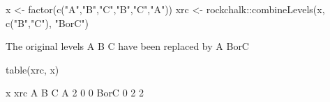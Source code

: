 \begin{Schunk}
\begin{Sinput}
  x <- factor(c("A","B","C","B","C","A"))
  xrc <- rockchalk::combineLevels(x, c("B","C"), "BorC")
\end{Sinput}
\begin{Soutput}
The original levels A B C 
have been replaced by A BorC 
\end{Soutput}
\begin{Sinput}
  table(xrc, x)
\end{Sinput}
\begin{Soutput}
      x
xrc    A B C
  A    2 0 0
  BorC 0 2 2
\end{Soutput}
\end{Schunk}
